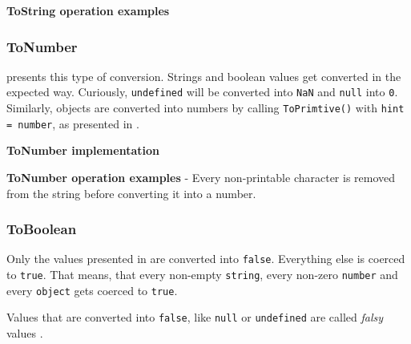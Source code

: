 \begin{code}
	\captionsetup{aboveskip=0pt, belowskip=10pt}
	\caption[ToString operation examples]{\textbf{ToString operation examples}}
	\label{code:background-to-string-operation}
\end{code}

\subsubsection{ToNumber}
 presents this type of conversion. Strings and boolean values get converted in the expected way. Curiously, \texttt{undefined} will be converted into \texttt{NaN} and \texttt{null} into \texttt{0}. Similarly, objects are converted into numbers by calling \texttt{ToPrimtive()} with \texttt{hint = number}, as presented in .

\begin{code}
	\captionsetup{aboveskip=0pt, belowskip=10pt}
	\caption[ToNumber implementation]{\textbf{ToNumber implementation}}
	\label{code:background-to-number-implementation}
\end{code}

\begin{code}
	\captionsetup{aboveskip=0pt, belowskip=10pt}
	\caption[ToNumber operation examples]{\textbf{ToNumber operation examples} - Every non-printable character is removed from the string before converting it into a number.}
	\label{code:background-to-number-operation}
\end{code}


\subsubsection{ToBoolean}
Only the values presented in  are converted into \texttt{false}. Everything else is coerced to \texttt{true}. That means, that every non-empty \texttt{string}, every non-zero \texttt{number} and every \texttt{object} gets coerced to \texttt{true}.

Values that are converted into \texttt{false}, like \texttt{null} or \texttt{undefined} are called \textit{falsy} values \citep{you-dont-know-js}.

